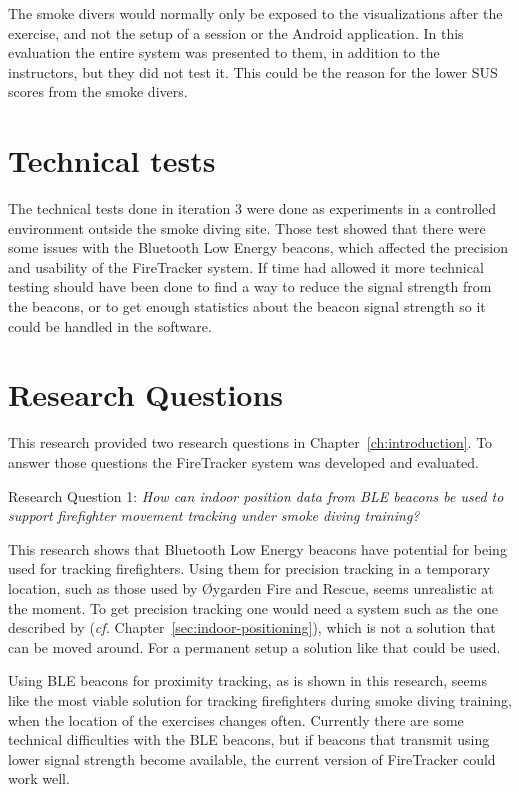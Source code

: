 \documentclass[../Main/thesis.tex]{subfiles}
\begin{document}
The smoke divers would normally only be exposed to the visualizations after the exercise, and not the setup of a session or the Android application.
In this evaluation the entire system was presented to them, in addition to the instructors, but they did not test it.
This could be the reason for the lower SUS scores from the smoke divers.

\section{Technical tests}
The technical tests done in iteration 3 were done as experiments in a controlled environment outside the smoke diving site.
Those test showed that there were some issues with the Bluetooth Low Energy beacons, which affected the precision and usability of the FireTracker system.
If time had allowed it more technical testing should have been done to find a way to reduce the signal strength from the beacons, or to get enough statistics about the beacon signal strength so it could be handled in the software.

\section{Research Questions}
This research provided two research questions in Chapter~\ref{ch:introduction}.
To answer those questions the FireTracker system was developed and evaluated.

Research Question 1: \textit{How can indoor position data from BLE beacons be used to support firefighter movement tracking under smoke diving training?}

This research shows that Bluetooth Low Energy beacons have potential for being used for tracking firefighters.
Using them for precision tracking in a temporary location, such as those used by Øygarden Fire and Rescue, seems unrealistic at the moment.
To get precision tracking one would need a system such as the one described by \citet{Takahashi2016} (\textit{cf.} Chapter~\ref{sec:indoor-positioning}), which is not a solution that can be moved around.
For a permanent setup a solution like that could be used.

Using BLE beacons for proximity tracking, as is shown in this research, seems like the most viable solution for tracking firefighters during smoke diving training, when the location of the exercises changes often.
Currently there are some technical difficulties with the BLE beacons, but if beacons that transmit using lower signal strength become available, the current version of FireTracker could work well.
\end{document}
